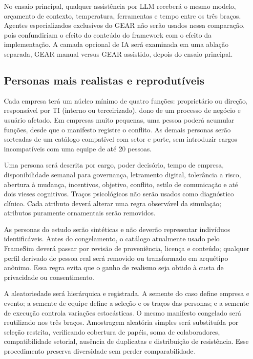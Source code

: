 No ensaio principal, qualquer assistência por LLM receberá o mesmo modelo, orçamento de contexto, temperatura, ferramentas e tempo entre os três braços. Agentes especializados exclusivos do GEAR não serão usados nessa comparação, pois confundiriam o efeito do conteúdo do framework com o efeito da implementação. A camada opcional de IA será examinada em uma ablação separada, GEAR manual versus GEAR assistido, depois do ensaio principal.

\subsection{Personas mais realistas e reprodutíveis}

Cada empresa terá um núcleo mínimo de quatro funções: proprietário ou direção, responsável por TI (interno ou terceirizado), dono de um processo de negócio e usuário afetado. Em empresas muito pequenas, uma pessoa poderá acumular funções, desde que o manifesto registre o conflito. As demais personas serão sorteadas de um catálogo compatível com setor e porte, sem introduzir cargos incompatíveis com uma equipe de até 20 pessoas.

Uma persona será descrita por cargo, poder decisório, tempo de empresa, disponibilidade semanal para governança, letramento digital, tolerância a risco, abertura à mudança, incentivos, objetivo, conflito, estilo de comunicação e até dois vieses cognitivos. Traços psicológicos não serão usados como diagnóstico clínico. Cada atributo deverá alterar uma regra observável da simulação; atributos puramente ornamentais serão removidos.

As personas do estudo serão sintéticas e não deverão representar indivíduos identificáveis. Antes do congelamento, o catálogo atualmente usado pelo FrameSim deverá passar por revisão de proveniência, licença e conteúdo; qualquer perfil derivado de pessoa real será removido ou transformado em arquétipo anônimo. Essa regra evita que o ganho de realismo seja obtido à custa de privacidade ou consentimento.

A aleatoriedade será hierárquica e registrada. A semente do caso define empresa e evento; a semente de equipe define a seleção e os traços das personas; e a semente de execução controla variações estocásticas. O mesmo manifesto congelado será reutilizado nos três braços. Amostragem aleatória simples será substituída por seleção restrita, verificando cobertura de papéis, soma de colaboradores, compatibilidade setorial, ausência de duplicatas e distribuição de resistência. Esse procedimento preserva diversidade sem perder comparabilidade.

